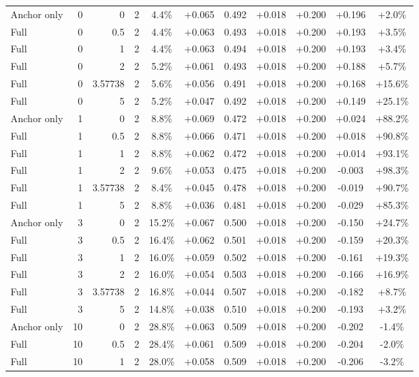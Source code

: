 \begin{table}[htbp]
\begin{tabular}{lrrrccccccc}
Anchor only & 0 & 0 & 2 & 4.4\% & +0.065 & 0.492 & +0.018 & +0.200 & +0.196 & +2.0\% \\
Full & 0 & 0.5 & 2 & 4.4\% & +0.063 & 0.493 & +0.018 & +0.200 & +0.193 & +3.5\% \\
Full & 0 & 1 & 2 & 4.4\% & +0.063 & 0.494 & +0.018 & +0.200 & +0.193 & +3.4\% \\
Full & 0 & 2 & 2 & 5.2\% & +0.061 & 0.493 & +0.018 & +0.200 & +0.188 & +5.7\% \\
Full & 0 & 3.57738 & 2 & 5.6\% & +0.056 & 0.491 & +0.018 & +0.200 & +0.168 & +15.6\% \\
Full & 0 & 5 & 2 & 5.2\% & +0.047 & 0.492 & +0.018 & +0.200 & +0.149 & +25.1\% \\
Anchor only & 1 & 0 & 2 & 8.8\% & +0.069 & 0.472 & +0.018 & +0.200 & +0.024 & +88.2\% \\
Full & 1 & 0.5 & 2 & 8.8\% & +0.066 & 0.471 & +0.018 & +0.200 & +0.018 & +90.8\% \\
Full & 1 & 1 & 2 & 8.8\% & +0.062 & 0.472 & +0.018 & +0.200 & +0.014 & +93.1\% \\
Full & 1 & 2 & 2 & 9.6\% & +0.053 & 0.475 & +0.018 & +0.200 & -0.003 & +98.3\% \\
Full & 1 & 3.57738 & 2 & 8.4\% & +0.045 & 0.478 & +0.018 & +0.200 & -0.019 & +90.7\% \\
Full & 1 & 5 & 2 & 8.8\% & +0.036 & 0.481 & +0.018 & +0.200 & -0.029 & +85.3\% \\
Anchor only & 3 & 0 & 2 & 15.2\% & +0.067 & 0.500 & +0.018 & +0.200 & -0.150 & +24.7\% \\
Full & 3 & 0.5 & 2 & 16.4\% & +0.062 & 0.501 & +0.018 & +0.200 & -0.159 & +20.3\% \\
Full & 3 & 1 & 2 & 16.0\% & +0.059 & 0.502 & +0.018 & +0.200 & -0.161 & +19.3\% \\
Full & 3 & 2 & 2 & 16.0\% & +0.054 & 0.503 & +0.018 & +0.200 & -0.166 & +16.9\% \\
Full & 3 & 3.57738 & 2 & 16.8\% & +0.044 & 0.507 & +0.018 & +0.200 & -0.182 & +8.7\% \\
Full & 3 & 5 & 2 & 14.8\% & +0.038 & 0.510 & +0.018 & +0.200 & -0.193 & +3.2\% \\
Anchor only & 10 & 0 & 2 & 28.8\% & +0.063 & 0.509 & +0.018 & +0.200 & -0.202 & -1.4\% \\
Full & 10 & 0.5 & 2 & 28.4\% & +0.061 & 0.509 & +0.018 & +0.200 & -0.204 & -2.0\% \\
Full & 10 & 1 & 2 & 28.0\% & +0.058 & 0.509 & +0.018 & +0.200 & -0.206 & -3.2\% \\

\end{tabular}
\end{table}
